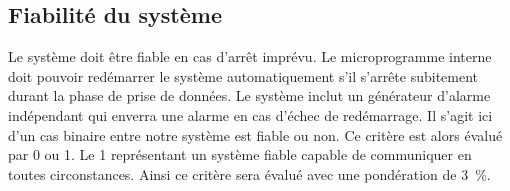 

\subsection{Fiabilité du système}
\label{s:cdc_aut_fiabsys}

Le système doit être fiable en cas d’arrêt imprévu.
Le microprogramme interne doit pouvoir redémarrer le système automatiquement s’il s’arrête subitement durant la phase de prise de données.
Le système inclut un générateur d’alarme indépendant qui enverra une alarme en cas d’échec de redémarrage.
Il s’agit ici d’un cas binaire entre notre système est fiable ou non.
Ce critère est alors évalué par 0 ou 1.
Le 1 représentant un système fiable capable de communiquer en toutes circonstances.
Ainsi ce critère sera évalué avec une pondération de 3~\%.